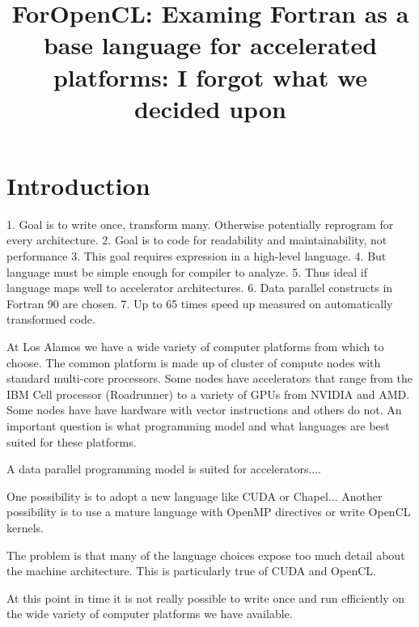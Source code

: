 

\title{ForOpenCL: Examing Fortran as a base language for accelerated platforms:
I forgot what we decided upon}

%
%

\maketitle

\begin{abstract}

\end{abstract}



\section{Introduction}

1. Goal is to write once, transform many. Otherwise potentially reprogram for every architecture.
2. Goal is to code for readability and maintainability, not performance
3. This goal requires expression in a high-level language.
4. But language must be simple enough for compiler to analyze.
5. Thus ideal if language maps well to accelerator architectures.
6. Data parallel constructs in Fortran 90 are chosen.
7. Up to 65 times speed up measured on automatically transformed code.

At Los Alamos we have a wide variety of computer platforms from which
to choose.  The common platform is made up of cluster of compute nodes
with standard multi-core processors.  Some nodes have accelerators
that range from the IBM Cell processor (Roadrunner) to a variety of
GPUs from NVIDIA and AMD.  Some nodes have have hardware with vector
instructions and others do not.  An important question is what programming
model and what languages are best suited for these platforms.

A data parallel programming model is suited for accelerators....

One possibility is to adopt a new language like CUDA or Chapel...
Another possibility is to use a mature language with OpenMP directives
or write OpenCL kernels.

The problem is that many of the language choices expose too much detail
about the machine architecture.  This is particularly true of CUDA and OpenCL.

At this point in time it is not really possible to write once and
run efficiently on the wide variety of computer platforms we have
available.

